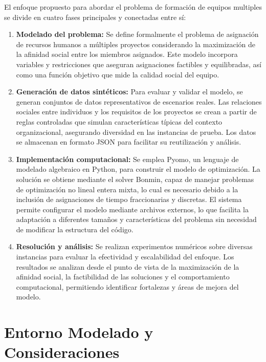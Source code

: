 \documentclass[conference]{IEEEtran}
\begin{document}
El enfoque propuesto para abordar el problema de formación de equipos multiples se divide en cuatro fases principales y conectadas entre sí:

\begin{enumerate}
    \item \textbf{Modelado del problema:} Se define formalmente el problema de asignación de recursos humanos a múltiples proyectos considerando la maximización de la afinidad social entre los miembros asignados. Este modelo incorpora variables y restricciones que aseguran asignaciones factibles y equilibradas, así como una función objetivo que mide la calidad social del equipo.

    \item \textbf{Generación de datos sintéticos:} Para evaluar y validar el modelo, se generan conjuntos de datos representativos de escenarios reales. Las relaciones sociales entre individuos y los requisitos de los proyectos se crean a partir de reglas controladas que simulan características típicas del contexto organizacional, asegurando diversidad en las instancias de prueba. Los datos se almacenan en formato JSON para facilitar su reutilización y análisis.

    \item \textbf{Implementación computacional:} Se emplea Pyomo\cite{pyomo_hart2011}, un lenguaje de modelado algebraico en Python, para construir el modelo de optimización. La solución se obtiene mediante el solver Bonmin\cite{bonmin_bonami2008}, capaz de manejar problemas de optimización no lineal entera mixta, lo cual es necesario debido a la inclusión de asignaciones de tiempo fraccionarias y discretas. El sistema permite configurar el modelo mediante archivos externos, lo que facilita la adaptación a diferentes tamaños y características del problema sin necesidad de modificar la estructura del código.

    \item \textbf{Resolución y análisis:} Se realizan experimentos numéricos sobre diversas instancias para evaluar la efectividad y escalabilidad del enfoque. Los resultados se analizan desde el punto de vista de la maximización de la afinidad social, la factibilidad de las soluciones y el comportamiento computacional, permitiendo identificar fortalezas y áreas de mejora del modelo.
\end{enumerate}



\section{Entorno Modelado y Consideraciones}
\end{document}
